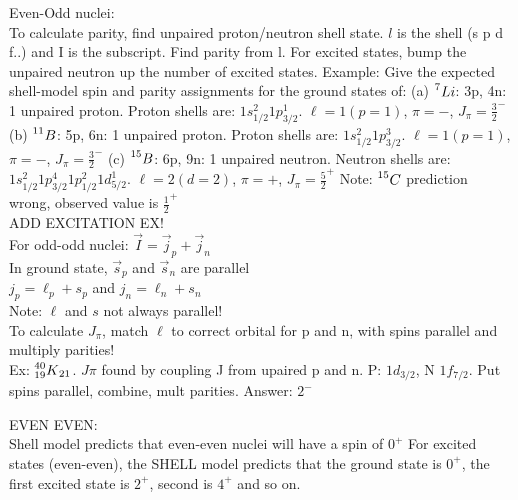 \documentclass{article}
\begin{document}
\begin{multicols}{3}
Even-Odd nuclei:\\
To calculate parity, find unpaired proton/neutron shell state.  $l$ is the shell (s p d f..) and I is the subscript.  Find parity from l.  For excited states, bump the unpaired neutron up the number of excited states.
\hspace*{0.01\textwidth} Example: Give the expected shell-model spin and parity assignments for the ground states of: (a) $ \prescript{7}{}{Li} $: 3p, 4n: 1 unpaired proton.  Proton shells are: $1s_{1/2}^{2}1p_{3/2}^{1}$.  $\ell = 1 (p=1)$, $\pi = -$, $J_{\pi} = \frac{3}{2}^{-}$ (b) $ \prescript{11}{}{B} $: 5p, 6n: 1 unpaired proton.  Proton shells are: $1s_{1/2}^{2}1p_{3/2}^{3}$.  $\ell = 1 (p=1)$, $\pi = -$, $J_{\pi} = \frac{3}{2}^{-}$ (c) $ \prescript{15}{}{B} $: 6p, 9n: 1 unpaired neutron.  Neutron shells are: $1s_{1/2}^{2}1p_{3/2}^{4}1p_{1/2}^{2}1d_{5/2}^{1}$.  $\ell = 2(d=2)$, $\pi = +$, $J_{\pi} = \frac{5}{2}^{+}$ Note: $\prescript{15}{}{C}$ prediction wrong, observed value is $\frac{1}{2}^{+}$\\
ADD EXCITATION EX!\\

For odd-odd nuclei: $\vec{I} = \vec{j}_{p} + \vec{j}_{n}$\\
In ground state, $\vec{s}_{p}$ and $\vec{s}_{n}$ are parallel\\
$j_{p} = \ell_{p} + s_{p}$ and $j_{n} = \ell_{n} + s_{n}$\\
Note: $\ell$ and $s$ not always parallel!\\
To calculate $J_{\pi}$, match $\ell$ to correct orbital for p and n, with spins parallel and multiply parities!\\
Ex: $\prescript{40}{19}{K}_{21}$.  $J\pi$ found by coupling J from upaired p and n.  P: $1d_{3/2}$, N $1f_{7/2}$.  Put spins parallel, combine, mult parities.  Answer: $2^{-}$


EVEN EVEN:\\
Shell model predicts that even-even nuclei will have a spin of $0^{+}$
For excited states (even-even), the SHELL model predicts that the ground state is $0^{+}$, the first excited state is $2^{+}$, second is $4^{+}$ and so on.\\


\end{multicols}
\end{document}
